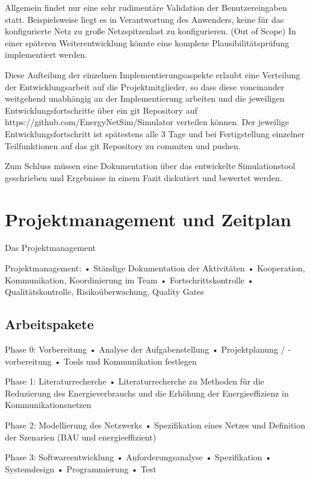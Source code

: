 \documentclass[12pt,titlepage]{article}
\begin{document}
Allgemein findet nur eine sehr rudimentäre Validation der Benutzereingaben statt. Beispielsweise liegt es in Verantwortung des Anwenders, keine für das konfigurierte Netz zu große Netzspitzenlast zu konfigurieren. (Out of Scope) In einer späteren Weiterentwicklung könnte eine komplexe Plausibilitätsprüfung implementiert werden.
 
Diese Aufteilung der einzelnen Implementierungsaspekte erlaubt eine Verteilung der Entwicklungsarbeit auf die Projektmitglieder, so dass diese voneinander weitgehend unabhängig an der Implementierung arbeiten und die jeweiligen Entwicklungsfortschritte über ein git Repository auf https://github.com/EnergyNetSim/Simulator verteilen können. Der jeweilige Entwicklungsfortschritt ist spätestens alle 3 Tage und bei Fertigstellung einzelner Teilfunktionen auf das git Repository zu commiten und pushen.
 
Zum Schluss müssen eine Dokumentation über das entwickelte Simulationstool geschrieben und Ergebnisse in einem Fazit diskutiert und bewertet werden. 
 
 




\section{Projektmanagement und Zeitplan}
Das Projektmanagement

 
 
Projektmanagement:
•	Ständige Dokumentation der Aktivitäten
•	Kooperation, Kommunikation, Koordinierung im Team
•	Fortschrittskontrolle
•	Qualitätskontrolle, Risikoüberwachung, Quality Gates
 
 
 
\subsection{Arbeitspakete}
Phase 0: Vorbereitung
•	Analyse der Aufgabenstellung
•	Projektplanung / -vorbereitung
•	Tools und Kommunikation festlegen
 
Phase 1: Literaturrecherche
•	Literaturrecherche zu Methoden für die Reduzierung des Energieverbrauchs und die Erhöhung der Energieeffizienz in Kommunikationsnetzen
 
Phase 2: Modellierung des Netzwerks
•	Spezifikation eines Netzes und Definition der Szenarien (BAU und energieeffizient)
 
Phase 3: Softwareentwicklung
•	Anforderungsanalyse
•	Spezifikation
•	Systemdesign
•	Programmierung
•	Test
 
\end{document}
